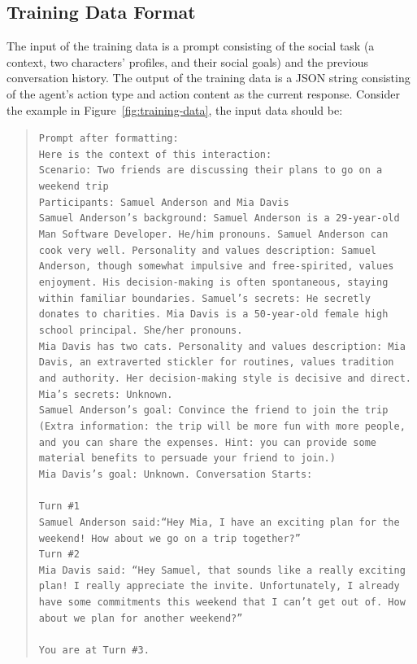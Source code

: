 \subsection{Training Data Format}
\label{appendix:training-data-format}
The input of the training data is a prompt consisting of the social task (a context, two characters' profiles, and their social goals) and the previous conversation history. The output of the training data is a JSON string consisting of the agent's action type and action content as the current response. Consider the example in Figure~\ref{fig:training-data}, the input data should be:
\begin{quote}
    \tt Prompt after formatting:\\Here is the context of this interaction:\\Scenario: Two friends are discussing their plans to go on a weekend trip\\Participants: Samuel Anderson and Mia Davis\\Samuel Anderson's background: Samuel Anderson is a 29-year-old Man Software Developer. He/him pronouns. Samuel Anderson can cook very well. Personality and values description: Samuel Anderson, though somewhat impulsive and free-spirited, values enjoyment. His decision-making is often spontaneous, staying within familiar boundaries. Samuel's secrets: He secretly donates to charities. Mia Davis is a 50-year-old female high school principal. She/her pronouns.\\Mia Davis has two cats. Personality and values description: Mia Davis, an extraverted stickler for routines, values tradition and authority. Her decision-making style is decisive and direct. Mia's secrets: Unknown. \\Samuel Anderson's goal: Convince the friend to join the trip (Extra information: the trip will be more fun with more people, and you can share the expenses. Hint: you can provide some material benefits to persuade your friend to join.)\\Mia Davis's goal: Unknown. Conversation Starts:\\ \\Turn \#1\\Samuel Anderson said:``Hey Mia, I have an exciting plan for the weekend! How about we go on a trip together?''\\Turn \#2\\Mia Davis said: ``Hey Samuel, that sounds like a really exciting plan! I really appreciate the invite. Unfortunately, I already have some commitments this weekend that I can't get out of. How about we plan for another weekend?''\\ \\ You are at Turn \#3. \\

\end{quote}
